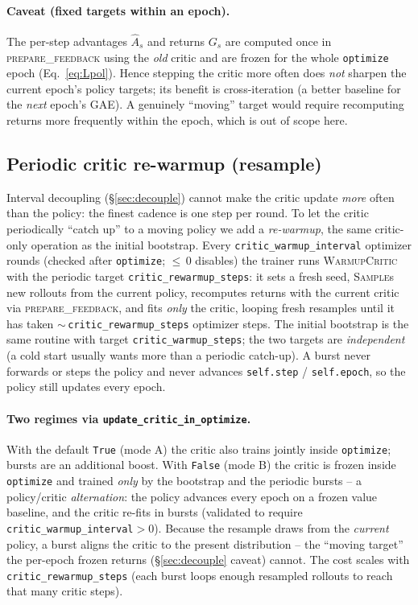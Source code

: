 \documentclass[11pt]{article}
\theoremstyle{plain}
\theoremstyle{remark}
\begin{document}
\paragraph{Caveat (fixed targets within an epoch).} The per-step advantages
$\hat A_s$ and returns $G_s$ are computed once in \textsc{prepare\_feedback} using
the \emph{old} critic and are frozen for the whole \texttt{optimize} epoch
(Eq.~\eqref{eq:Lpol}). Hence stepping the critic more often does \emph{not} sharpen
the current epoch's policy targets; its benefit is cross-iteration (a better
baseline for the \emph{next} epoch's GAE). A genuinely ``moving'' target would
require recomputing returns more frequently within the epoch, which is out of scope
here.

\subsection{Periodic critic re-warmup (resample)}
\label{sec:rewarmup}

Interval decoupling (\S\ref{sec:decouple}) cannot make the critic update \emph{more}
often than the policy: the finest cadence is one step per round. To let the critic
periodically ``catch up'' to a moving policy we add a \emph{re-warmup}, the same
critic-only operation as the initial bootstrap. Every \texttt{critic\_warmup\_interval}
optimizer rounds (checked after \texttt{optimize}; ${\le}\,0$ disables) the trainer runs
\textsc{WarmupCritic} with the periodic target \texttt{critic\_rewarmup\_steps}: it sets a
fresh seed, \textsc{Sample}s new rollouts from the current policy, recomputes returns with
the current critic via \textsc{prepare\_feedback}, and fits \emph{only} the critic, looping
fresh resamples until it has taken ${\sim}\,$\texttt{critic\_rewarmup\_steps} optimizer
steps. The initial bootstrap is the same routine with target \texttt{critic\_warmup\_steps};
the two targets are \emph{independent} (a cold start usually wants more than a periodic
catch-up). A burst never forwards or steps the policy and never advances \texttt{self.step}
/ \texttt{self.epoch}, so the policy still updates every epoch.

\paragraph{Two regimes via \texttt{update\_critic\_in\_optimize}.}
With the default \texttt{True} (mode A) the critic also trains jointly inside
\texttt{optimize}; bursts are an additional boost. With \texttt{False} (mode B) the critic
is frozen inside \texttt{optimize} and trained \emph{only} by the bootstrap and the periodic
bursts -- a policy/critic \emph{alternation}: the policy advances every epoch on a frozen
value baseline, and the critic re-fits in bursts (validated to require
\texttt{critic\_warmup\_interval}${}>0$). Because the resample draws from the
\emph{current} policy, a burst aligns the critic to the present distribution -- the
``moving target'' the per-epoch frozen returns (\S\ref{sec:decouple} caveat) cannot. The
cost scales with \texttt{critic\_rewarmup\_steps} (each burst loops enough resampled
rollouts to reach that many critic steps).
\end{document}
